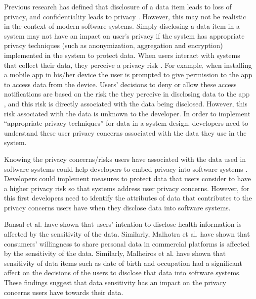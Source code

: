 \documentclass{sigchi}
\begin{document}
Previous research has defined that disclosure of a data item leads to loss of privacy, and confidentiality leads to privacy \cite {gurses2014can}. However, this may not be realistic in the context of modern software systems. Simply disclosing a data item in a system may not have an impact on user's privacy if the system has appropriate privacy techniques (such as anonymization, aggregation and encryption) implemented in the system to protect data. When users interact with systems that collect their data, they perceive a privacy risk \cite {malheiros2013fairly}. For example, when installing a mobile app in his/her device the user is prompted to give permission to the app to access data from the device. Users' decisions to deny or allow these access notifications are based on the risk the they perceive in disclosing data to the app \cite {kobsa2007privacy, li2010understanding, malhotra2004internet}, and this risk is directly associated with the data being disclosed. However, this risk associated with the data is unknown to the developer. In order to implement \enquote{appropriate privacy techniques} for data in a system design, developers need to understand these user privacy concerns associated with the data they use in the system.  

Knowing the privacy concerns/risks users have associated with the data used in software systems could help developers to embed privacy into software systems \cite {senarath2018under, marr2015big, tene2012big, rubinstein2012big}. Developers could implement measures to protect data that users consider to have a higher privacy risk so that systems address user privacy concerns. However, for this first developers need to identify the attributes of data that contributes to the privacy concerns users have when they disclose data into software systems. 

Bansal et al. \cite {bansal2010impact} have shown that users' intention to disclose health information is affected by the sensitivity of the data. Similarly, Malhotra et al. \cite {malhotra2004internet} have shown that consumers' willingness to share personal data in commercial platforms is affected by the sensitivity of the data. Similarly, Malheiros et al. \cite {malheiros2013fairly} have shown that sensitivity of data items such as date of birth and occupation had a significant affect on the decisions of the users to disclose that data into software systems. These findings suggest that data sensitivity has an impact on the privacy concerns users have towards their data.
\end{document}
